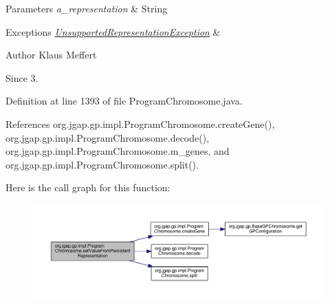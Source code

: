 \begin{DoxyParams}{Parameters}
{\em a\-\_\-representation} & String \\
\hline
\end{DoxyParams}

\begin{DoxyExceptions}{Exceptions}
{\em \hyperlink{classorg_1_1jgap_1_1_unsupported_representation_exception}{Unsupported\-Representation\-Exception}} & \\
\hline
\end{DoxyExceptions}
\begin{DoxyAuthor}{Author}
Klaus Meffert 
\end{DoxyAuthor}
\begin{DoxySince}{Since}
3. 
\end{DoxySince}


Definition at line 1393 of file Program\-Chromosome.\-java.



References org.\-jgap.\-gp.\-impl.\-Program\-Chromosome.\-create\-Gene(), org.\-jgap.\-gp.\-impl.\-Program\-Chromosome.\-decode(), org.\-jgap.\-gp.\-impl.\-Program\-Chromosome.\-m\-\_\-genes, and org.\-jgap.\-gp.\-impl.\-Program\-Chromosome.\-split().



Here is the call graph for this function\-:
\nopagebreak
\begin{figure}[H]
\begin{center}
\leavevmode
\includegraphics[width=350pt]{classorg_1_1jgap_1_1gp_1_1impl_1_1_program_chromosome_a2ea8008dc2f1662945564f8d0ee67c82_cgraph}
\end{center}
\end{figure}


